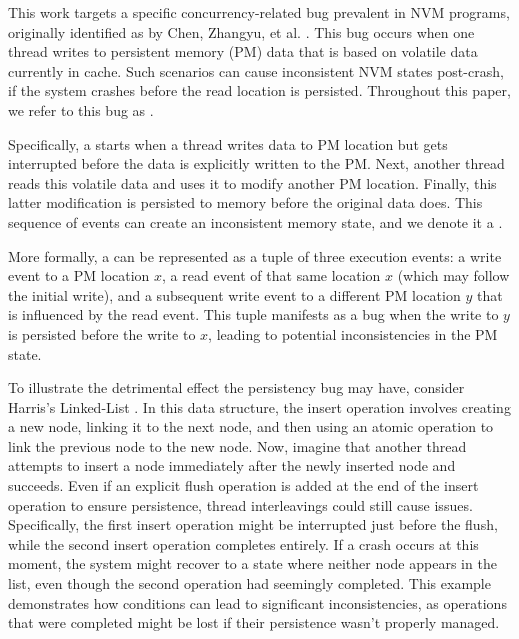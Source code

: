 \documentclass[nonacm,sigplan]{acmart}
\begin{document}
This work targets a specific concurrency-related bug prevalent in NVM programs, originally identified as \textit{\NamePMRaceRace} by Chen, Zhangyu, et al. \cite{pmrace2022}. This bug occurs when one thread writes to persistent memory (PM) data that is based on volatile data currently in cache. Such scenarios can cause inconsistent NVM states post-crash, if the system crashes before the read location is persisted. Throughout this paper, we refer to this bug as \textit{\NameRace}.


Specifically, a \NameRace starts when a thread writes data to PM location but gets interrupted before the data is explicitly written to the PM. Next, another thread reads this volatile data and uses it to modify another PM location. Finally, this latter modification is persisted to memory before the original data does. This sequence of events can create an inconsistent memory state, and we denote it a \textit{\NameRace}.

More formally, a \NameRace can be represented as a tuple of three execution events: a write event to a PM location $x$, a read event of that same location $x$ (which may follow the initial write), and a subsequent write event to a different PM location $y$ that is influenced by the read event. This tuple manifests as a bug when the write to $y$ is persisted before the write to $x$, leading to potential inconsistencies in the PM state.


To illustrate the detrimental effect the persistency bug may have, consider Harris's Linked-List \cite{harris2001}. In this data structure, the insert operation involves creating a new node, linking it to the next node, and then using an atomic operation to link the previous node to the new node. Now, imagine that another thread attempts to insert a node immediately after the newly inserted node and succeeds. Even if an explicit flush operation is added at the end of the insert operation to ensure persistence, thread interleavings could still cause issues. Specifically, the first insert operation might be interrupted just before the flush, while the second insert operation completes entirely. If a crash occurs at this moment, the system might recover to a state where neither node appears in the list, even though the second operation had seemingly completed. This example demonstrates how \NameRace conditions can lead to significant inconsistencies, as operations that were completed might be lost if their persistence wasn't properly managed.
\end{document}
